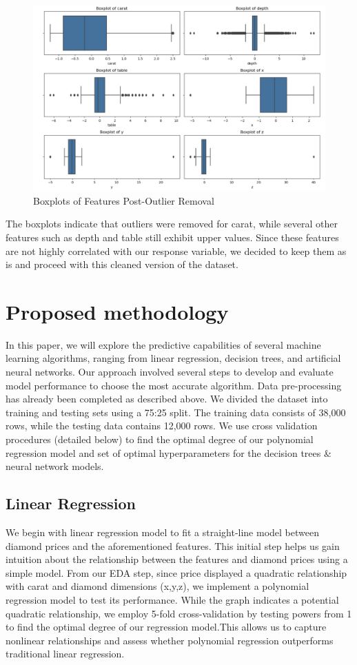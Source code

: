 \documentclass[conference]{IEEEtran}
\begin{document}
\begin{figure}[H]
    \centering
    \includegraphics[width=0.8\linewidth]{boxplot.png} %
    \caption{Boxplots of Features Post-Outlier Removal}
    \label{fig:boxplots}
\end{figure}

The boxplots indicate that outliers were removed for carat, while several other features such as depth and table still exhibit upper values. Since these features are not highly correlated with our response variable, we decided to keep them as is and proceed with this cleaned version of the dataset. 

\section{Proposed methodology}

In this paper, we will explore the predictive capabilities of several machine learning algorithms, ranging from linear regression, decision trees, and artificial neural networks. Our approach involved several steps to develop and evaluate model performance to choose the most accurate algorithm. Data pre-processing has already been completed as described above. We divided the dataset into training and testing sets using a 75:25 split. The training data consists of 38,000 rows, while the testing data contains 12,000 rows. We use cross validation procedures (detailed below) to find the optimal degree of our polynomial regression model and set of optimal hyperparameters for the decision trees \& neural network models. 

\subsection{Linear Regression}

We begin with linear regression model to fit a straight-line model between diamond prices and the aforementioned features. This initial step helps us gain intuition about the relationship between the features and diamond prices using a simple model. From our EDA step, since price displayed a quadratic relationship with carat and diamond dimensions (x,y,z), we implement a polynomial regression model to test its performance. While the graph indicates a potential quadratic relationship, we employ 5-fold cross-validation by testing powers from 1 to find the optimal degree of our regression model.This allows us to capture nonlinear relationships and assess whether polynomial regression outperforms traditional linear regression.
\end{document}
